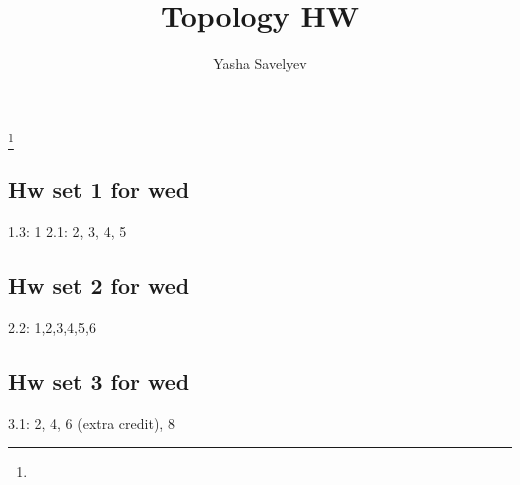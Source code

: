 \documentclass{amsart}
\numberwithin{equation}{section}
\theoremstyle{definition}
\theoremstyle{remark}
\begin{document}
\title{Topology HW}
\author{Yasha Savelyev}
\thanks {}
\maketitle
\subsection{Hw set 1 for wed}
1.3: 1  
2.1: 2, 3, 4, 5  
\subsection{Hw set 2 for wed}
2.2: 1,2,3,4,5,6
\subsection{Hw set 3 for wed}
3.1: 2, 4, 6 (extra credit), 8
\end{document}
